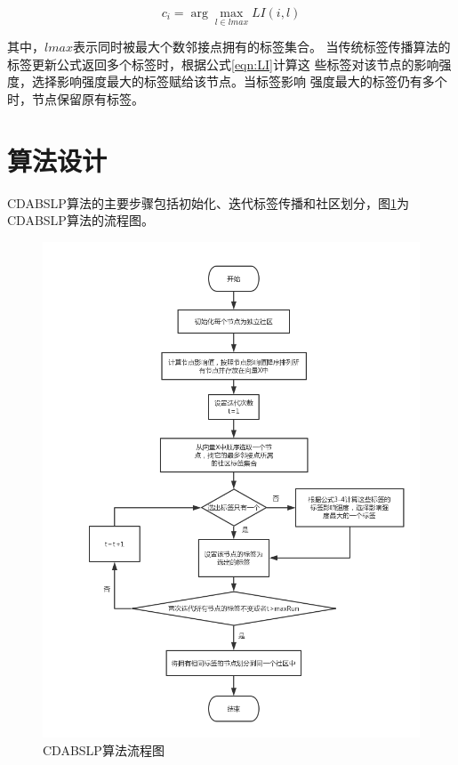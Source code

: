 \begin{equation}
  \label{eqn:ci}
  c_i=\arg\max_{l \in lmax} LI(i,l)
\end{equation}

其中，$lmax $表示同时被最大个数邻接点拥有的标签集合。 
当传统标签传播算法的标签更新公式返回多个标签时，根据公式\ref{eqn:LI}计算这
些标签对该节点的影响强度，选择影响强度最大的标签赋给该节点。当标签影响
强度最大的标签仍有多个时，节点保留原有标签。 

\section{算法设计}
CDABSLP算法的主要步骤包括初始化、迭代标签传播和社区划分，图\ref{fig:fig3-3}为
CDABSLP算法的流程图。

\begin{figure}
  \centering
  \includegraphics[width=1\textwidth]{figures/fig3-3}
  \caption{CDABSLP算法流程图}\label{fig:fig3-3}
 \end{figure}

